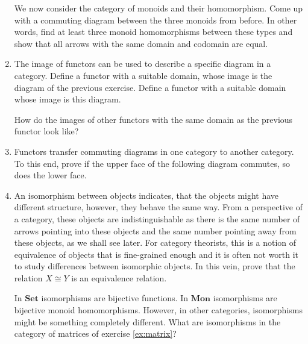 \documentclass{scrartcl}
\begin{document}
\begin{enumerate}
  We now consider the category of monoids and their homomorphism.
  Come up with a commuting diagram between the three monoids from before.
  In other words, find at least three monoid homomorphisms between these types and show that all arrows with the same domain and codomain are equal.

\item
  The image of functors can be used to describe a specific diagram in a category.
  Define a functor with a suitable domain, whose image is the diagram of the previous exercise.
  Define a functor with a suitable domain whose image is this diagram.
  \begin{center}
  \end{center}
  How do the images of other functors with the same domain as the previous functor look like?

\item Functors transfer commuting diagrams in one category to another category.
  To this end, prove if the upper face of the following diagram commutes, so does the lower face.
  \begin{center}
  \end{center}

\item
  An isomorphism between objects indicates, that the objects might have different structure, however, they behave the same way.
  From a perspective of a category, these objects are indistinguishable as there is the same number of arrows pointing into these objects and the same number pointing away from these objects, as we shall see later.
  For category theorists, this is a notion of equivalence of objects that is fine-grained enough and it is often not worth it to study differences between isomorphic objects.
  In this vein, prove that the relation $X \cong Y$ is an equivalence relation.

  In $\mathbf{Set}$ isomorphisms are bijective functions.
  In $\mathbf{Mon}$ isomorphisms are bijective monoid homomorphisms.
  However, in other categories, isomorphisms might be something completely different.
  What are isomorphisms in the category of matrices of exercise \ref{ex:matrix}?

\end{enumerate}



\end{document}
